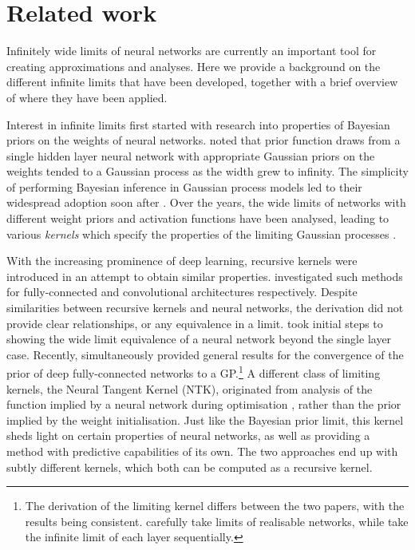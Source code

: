 \documentclass{article}
\theoremstyle{definition}
\begin{document}
\section{Related work}
Infinitely wide limits of neural networks are currently an important tool for creating approximations and analyses. Here we provide a background on the different infinite limits that have been developed, together with a brief overview of where they have been applied.

Interest in infinite limits first started with research into properties of Bayesian priors on the weights of neural networks. \citet{neal1996bayesian} noted that prior function draws from a single hidden layer neural network with appropriate Gaussian priors on the weights tended to a Gaussian process as the width grew to infinity. The simplicity of performing Bayesian inference in Gaussian process models led to their widespread adoption soon after \citep{williams1996gpr,gpml}. Over the years, the wide limits of networks with different weight priors and activation functions have been analysed, leading to various \emph{kernels} which specify the properties of the limiting Gaussian processes \citep{williams1997inf,cho2009mkm}.

With the increasing prominence of deep learning, recursive kernels were introduced in an attempt to obtain similar properties. \citet{cho2009mkm,mairal2014ckn} investigated such methods for fully-connected and convolutional architectures respectively. Despite similarities between recursive kernels and neural networks, the derivation did not provide clear relationships, or any equivalence in a limit. \citet{hazan2015} took initial steps to showing the wide limit equivalence of a neural network beyond the single layer case. Recently, \citet{matthews2018dnnlimit,lee2018dnnlimit} simultaneously provided general results for the convergence of the prior of deep fully-connected networks to a GP.\footnote{The derivation of the limiting kernel differs between the two papers, with the results being consistent. \citet{matthews2018dnnlimit} carefully take limits of realisable networks, while \citet{lee2018dnnlimit} take the infinite limit of each layer sequentially.%
} 
A different class of limiting kernels, the Neural Tangent Kernel (NTK), originated from analysis of the function implied by a neural network during optimisation \citep{jacot2018ntk}, rather than the prior implied by the weight initialisation. Just like the Bayesian prior limit, this kernel sheds light on certain properties of neural networks, as well as providing a method with predictive capabilities of its own. 
The two approaches end up with subtly different kernels, which both can be computed as a recursive kernel.
\end{document}
